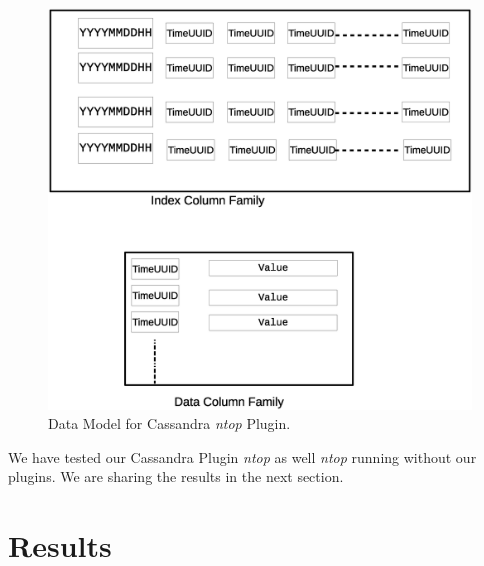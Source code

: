       \begin{figure}[htb]
	    \centering
	    \includegraphics[scale = .4]{data_model}
	    \caption{Data Model for Cassandra \emph{ntop} Plugin.} 
	    \label{datamodel}
	  \end{figure}
	  
      We have tested our Cassandra Plugin \emph{ntop} as well \emph{ntop} running without our plugins. We are sharing the results in the next 
      section.
      \section{Results}
      